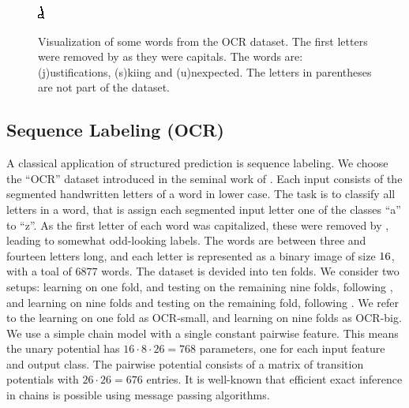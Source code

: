 \begin{figure}
    \includegraphics[width=.068\linewidth, frame]{evaluation/images/unexpected_08}\\
    \caption{%
        Visualization of some words from the OCR dataset. The first letters were removed by \citet{taskar2003max} as 
        they were capitals.
        The words are: (j)ustifications, (s)kiing and (u)nexpected. The letters in parentheses are not part of the dataset.
    }
\end{figure}
\subsection{Sequence Labeling (OCR)}
A classical application of structured prediction is sequence labeling.
We choose the ``OCR'' dataset introduced in the seminal work of \citet{taskar2003max}.
Each input consists of the segmented handwritten letters of a word in lower
case. The task is to classify all letters in a word, that is assign each
segmented input letter one of the classes ``a'' to ``z''. As the first letter
of each word was capitalized, these were removed by \citet{taskar2003max},
leading to somewhat odd-looking labels. The words are between three and fourteen
letters long, and each letter is represented as a binary image of size $16
\time 8$, with a toal of $6877$ words.
The dataset is devided into ten folds. We consider two setups: learning
on one fold, and testing on the remaining nine folds, following \citet{taskar2003max},
and learning on nine folds and testing on the remaining fold, following \citet{lacoste}.
We refer to the learning on one fold as OCR-small, and learning on nine folds as OCR-big.
We use a simple chain model with a single constant pairwise feature.
This means the unary potential has $16 \cdot 8 \cdot 26 = 768$ parameters, one for each input
feature and output class. The pairwise potential consists of a matrix of
transition potentials with $26 \cdot 26=676$ entries.
It is well-known that efficient exact inference in chains is possible using
message passing algorithms. 


